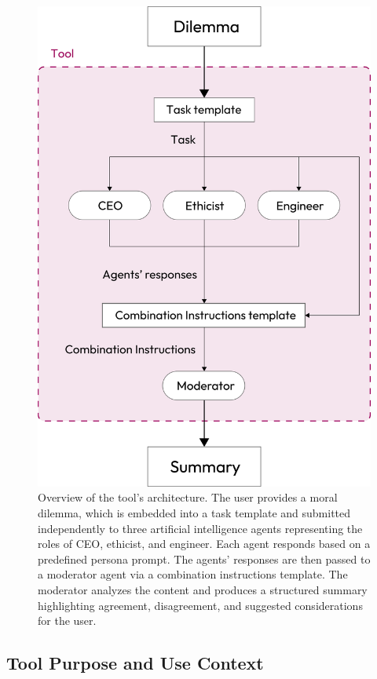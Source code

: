 \begin{figure}[h]
  \centering
  \includegraphics[width=\linewidth]{impl}
  \caption{Overview of the tool's architecture. The user provides a moral dilemma, which is embedded into a task template and submitted independently to three artificial intelligence agents representing the roles of CEO, ethicist, and engineer. Each agent responds based on a predefined persona prompt. The agents' responses are then passed to a moderator agent via a combination instructions template. The moderator analyzes the content and produces a structured summary highlighting agreement, disagreement, and suggested considerations for the user.}
  \label{fig:impl}
\end{figure}

\subsection{Tool Purpose and Use Context}

